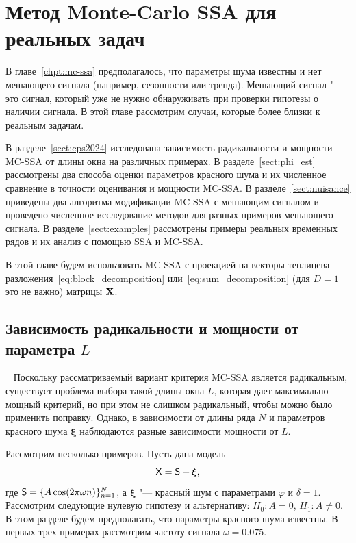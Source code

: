 \documentclass[specialist,
substylefile = spbu_report.rtx,
subf,href,colorlinks=true, 12pt]{disser}
\theoremstyle{definition}
\newcommand{\bfxi}{\boldsymbol{\xi}}
\begin{document}
\chapter{Метод Monte-Carlo SSA для реальных задач}\label{chpt:mc_ssa_real}
В главе~\ref{chpt:mc-ssa} предполагалось, что параметры шума известны и нет мешающего сигнала (например, сезонности или тренда). Мешающий сигнал "--- это сигнал, который уже не нужно обнаруживать при проверки гипотезы о наличии сигнала.  В этой главе рассмотрим случаи, которые более близки к реальным задачам.

В разделе~\ref{sect:cps2024} исследована зависимость радикальности и мощности MC-SSA от длины окна на различных примерах. В разделе~\ref{sect:phi_est} рассмотрены два способа оценки параметров красного шума и их численное сравнение в точности оценивания и мощности MC-SSA. В разделе~\ref{sect:nuisance} приведены два алгоритма модификации MC-SSA с мешающим сигналом и проведено численное исследование методов для разных примеров мешающего сигнала. В разделе~\ref{sect:examples} рассмотрены примеры реальных временных рядов и их анализ с помощью SSA и MC-SSA.


В этой главе будем использовать MC-SSA с проекцией на векторы теплицева разложения~\eqref{eq:block_decomposition} или~\eqref{eq:sum_decomposition} (для $D=1$ это не важно) матрицы $\mathbf{X}$.

\section{Зависимость радикальности и мощности от параметра $L$}~\label{sect:cps2024}
Поскольку рассматриваемый вариант критерия MC-SSA является радикальным, существует проблема выбора такой длины окна $L$, которая дает максимально мощный критерий, но при этом не слишком радикальный, чтобы можно было применить поправку. Однако, в зависимости от длины ряда $N$ и параметров красного шума $\bfxi$ наблюдаются разные зависимости мощности от $L$.

Рассмотрим несколько примеров. Пусть дана модель
\[
    \mathsf{X}=\mathsf{S}+{\boldsymbol\xi},
\]
где $\mathsf{S}=\{A\cos(2\pi\omega n)\}_{n=1}^N$, а ${\boldsymbol\xi}$ "--- красный шум с параметрами $\varphi$ и $\delta=1$. Рассмотрим следующие нулевую гипотезу и альтернативу: $H_0:A=0$, $H_1:A\ne0$. В этом разделе будем предполагать, что параметры красного шума известны. В первых трех примерах рассмотрим частоту сигнала $\omega = 0.075$.
\end{document}
